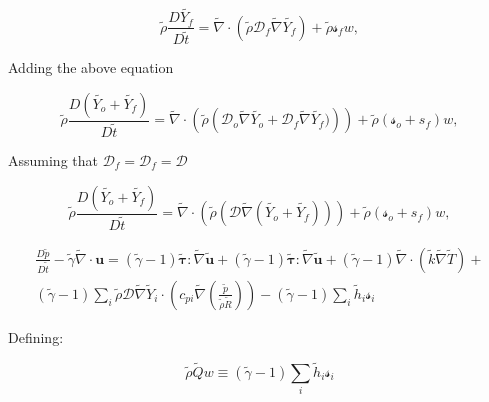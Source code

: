 \documentclass[preprint,12pt,authoryear]{elsarticle}
\begin{document}
\begin{equation}
	\tilde{\rho} \frac{D  \tilde{Y_f}}{D \tilde{t}}
= 
	\tilde{\nabla}\cdot( \tilde{\rho} \mathcal{D}_f\tilde{\nabla} \tilde{Y_f})
	+
        \tilde{\rho}\mathcal{s}_fw	
 ,
\end{equation}

Adding the above equation

\begin{equation}
	\tilde{\rho} \frac{D  (\tilde{Y_o}+\tilde{Y_f})}{D \tilde{t}}
= 
	\tilde{\nabla}
	\cdot
	\left( 
		\tilde{\rho} 
		\left( 
			\mathcal{D}_o\tilde{\nabla} \tilde{Y_o}
			+
			\mathcal{D}_f\tilde{\nabla} \tilde{Y_f})
		\right) 
	\right) 
	+
	\tilde{\rho}(\mathcal{s}_o+{s}_f)w	
 ,
\end{equation}

Assuming that $\mathcal{D}_f=\mathcal{D}_f=\mathcal{D}$

\begin{equation}
	\tilde{\rho} \frac{D  (\tilde{Y_o}+\tilde{Y_f})}{D \tilde{t}}
= 
	\tilde{\nabla}
	\cdot
	\left( 
		\tilde{\rho} 
		\left( 
			\mathcal{D}\tilde{\nabla} (\tilde{Y_o}+\tilde{Y_f})
		\right) 
	\right) 
	+
	\tilde{\rho}(\mathcal{s}_o+{s}_f)w	
 ,
\end{equation}


\begin{equation}
\begin{split}
        \frac{D \tilde{p}}{D\tilde{t}}
	-
	\tilde{\gamma}
	\tilde{\nabla}\cdot{\mathbf{u}}
        =
	(\tilde{\gamma}-1)
        \pmb{\tilde{\tau}}:\tilde{\nabla} \tilde{\mathbf{u}} 
        + 
	(\tilde{\gamma}-1)
        \pmb{\tilde{\tau}}:\tilde{\nabla} \tilde{\mathbf{u}} 
        + 
	(\tilde{\gamma}-1)
        \tilde{\nabla} \cdot (\tilde{k}\tilde{\nabla} \tilde{T})
        +
	\\
	(\tilde{\gamma}-1)
        \sum\limits_i 
        \tilde{\rho}
        \mathcal{D}
        \tilde{\nabla}
        \tilde{Y}_i     
        \cdot
        \left(
                c_{pi}
                \tilde{\nabla}
                \left(
                	\frac{\tilde{p}}{\tilde{\rho}\tilde{R}}
                \right)
        \right)
	- 
	(\tilde{\gamma}-1)
        \sum\limits_i
        \tilde{h}_i
        \mathcal{s}_i	
\end{split}
\end{equation}

Defining:

\begin{equation}
\tilde{\rho}\tilde{Q}w
\equiv
(\tilde{\gamma}-1)
\sum\limits_i
\tilde{h}_i
\mathcal{s}_i	
\end{equation}
\end{document}
